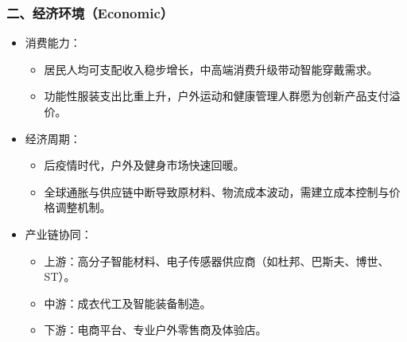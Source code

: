 \documentclass[UTF8]{report}
\theoremstyle{MyLineTheoremStyle} %
\theoremstyle{MyBlockTheoremStyle} %
\theoremstyle{MySubsubsectionStyle} %
\begin{document}
    \subsubsection{二、经济环境（Economic）}
        \begin{itemize}
            \item 消费能力：
                \begin{itemize}
                    \item 居民人均可支配收入稳步增长，中高端消费升级带动智能穿戴需求。
                    \item 功能性服装支出比重上升，户外运动和健康管理人群愿为创新产品支付溢价。
                \end{itemize}
            \item 经济周期：
                \begin{itemize}
                    \item 后疫情时代，户外及健身市场快速回暖。
                    \item 全球通胀与供应链中断导致原材料、物流成本波动，需建立成本控制与价格调整机制。
                \end{itemize}
            \item 产业链协同：
                \begin{itemize}
                    \item 上游：高分子智能材料、电子传感器供应商（如杜邦、巴斯夫、博世、ST）。
                    \item 中游：成衣代工及智能装备制造。
                    \item 下游：电商平台、专业户外零售商及体验店。
                \end{itemize}
        \end{itemize}
\end{document}
